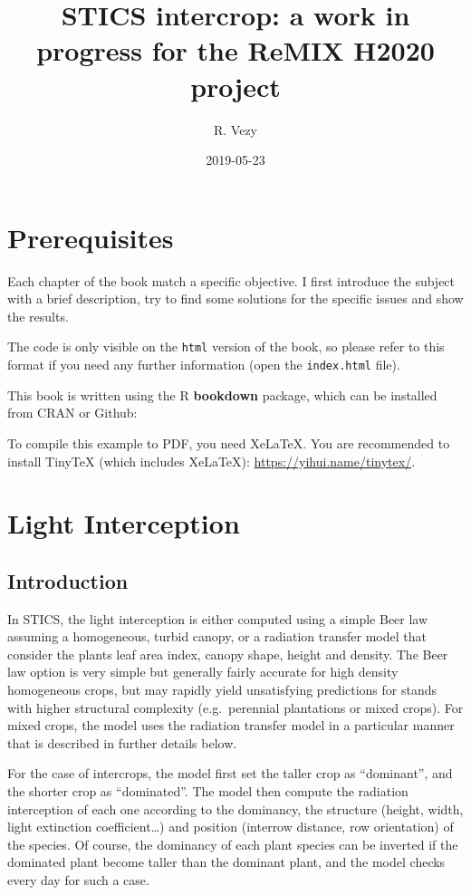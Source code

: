\documentclass[]{book}
\title{STICS intercrop: a work in progress for the ReMIX H2020 project}
\author{R. Vezy}
\date{2019-05-23}
\begin{document}
\maketitle

{
\setcounter{tocdepth}{1}
\tableofcontents
}
\hypertarget{prerequisites}{%
\chapter{Prerequisites}\label{prerequisites}}

Each chapter of the book match a specific objective. I first introduce the subject with a brief description, try to find some solutions for the specific issues and show the results.

The code is only visible on the \texttt{html} version of the book, so please refer to this format if you need any further information (open the \texttt{index.html} file).

This book is written using the R \textbf{bookdown} package, which can be installed from CRAN or Github:

To compile this example to PDF, you need XeLaTeX. You are recommended to install TinyTeX (which includes XeLaTeX): \url{https://yihui.name/tinytex/}.

\hypertarget{Light}{%
\chapter{Light Interception}\label{Light}}

\hypertarget{introduction}{%
\section{Introduction}\label{introduction}}

In STICS, the light interception is either computed using a simple Beer law assuming a homogeneous, turbid canopy, or a radiation transfer model that consider the plants leaf area index, canopy shape, height and density. The Beer law option is very simple but generally fairly accurate for high density homogeneous crops, but may rapidly yield unsatisfying predictions for stands with higher structural complexity (e.g.~perennial plantations or mixed crops). For mixed crops, the model uses the radiation transfer model in a particular manner that is described in further details below.

For the case of intercrops, the model first set the taller crop as ``dominant'', and the shorter crop as ``dominated''. The model then compute the radiation interception of each one according to the dominancy, the structure (height, width, light extinction coefficient\ldots{}) and position (interrow distance, row orientation) of the species. Of course, the dominancy of each plant species can be inverted if the dominated plant become taller than the dominant plant, and the model checks every day for such a case.
\end{document}
